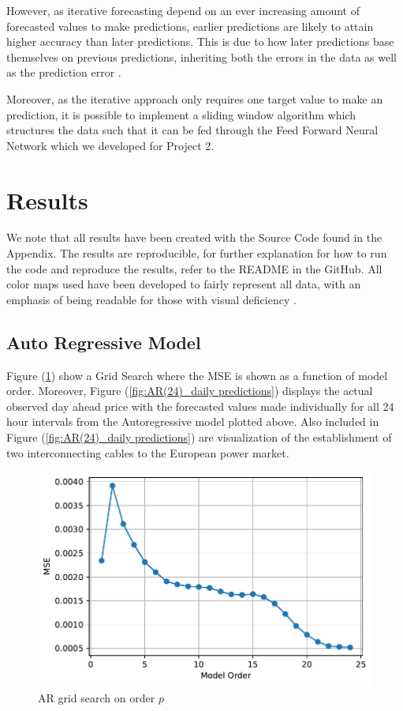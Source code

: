 \documentclass
[twocolumn,
secnumarabic,
nobibnotes,
aps,
prl,
reprint,
groupedaddress,
amsmath,
amssymb,
]{revtex4-2}
\begin{document}
However, as iterative forecasting depend on an ever increasing amount of forecasted values to make predictions, earlier predictions are likely to attain higher accuracy than later predictions. This is due to how later predictions base themselves on previous predictions, inheriting both the errors in the data as well as the prediction error \cite{Geron2019}.

Moreover, as the iterative approach only requires one target value to make an prediction, it is possible to implement a sliding window algorithm which structures the data such that it can be fed through the Feed Forward Neural Network which we developed for Project 2.

\section{Results}
We note that all results have been created with the Source Code found in the Appendix. The results are reproducible, for further explanation for how to run the code and reproduce the results, refer to the README in the GitHub. All color maps used have been developed to fairly represent all data, with an emphasis of being readable for those with visual deficiency \cite{Crameri2021}. 

\subsection{Auto Regressive Model}
Figure (\ref{fig:AR_gridsearch}) show a Grid Search where the MSE is shown as a function of model order. 
Moreover, Figure (\ref{fig:AR(24)_daily predictions}) displays the actual observed day ahead price with the forecasted values made individually for all 24 hour intervals from the Autoregressive model plotted above. Also included in Figure (\ref{fig:AR(24)_daily predictions}) are visualization of the establishment of two interconnecting cables to the European power market.

\begin{figure}
  \includegraphics[width=\columnwidth]{figures/AR_gridsearch.pdf} 
  \caption{\label{fig:AR_gridsearch} AR grid search on order $p$}
\end{figure}
\end{document}
